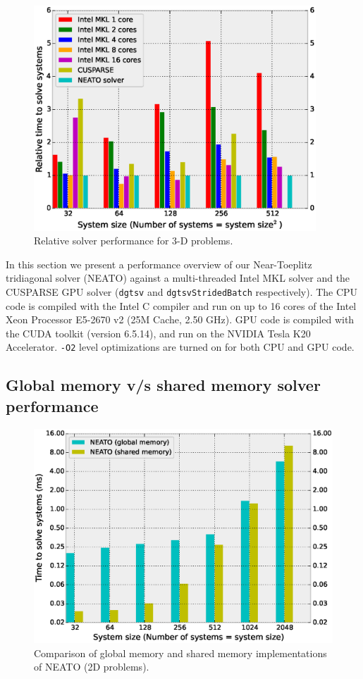 \documentclass{elsarticle}
\begin{document}
\begin{figure}[h!]
\begin{center}
\includegraphics[width=300pt]{fig/bench-3d.eps}
\caption{Relative solver performance for 3-D problems.}
\label{fig:bench-3d}
\end{center}
\end{figure}

In this section we present a performance overview
of our Near-Toeplitz tridiagonal solver (NEATO)
against a multi-threaded Intel MKL solver and
the CUSPARSE GPU solver
(\texttt{dgtsv} and \texttt{dgtsvStridedBatch} respectively).
The CPU code is compiled with the Intel C compiler
and run on up to 16 cores of the
Intel Xeon Processor E5-2670 v2 (25M Cache, 2.50 GHz).
GPU code is compiled with the CUDA toolkit (version 6.5.14),
and run on the
NVIDIA Tesla K20 Accelerator.
\texttt{-O2} level optimizations are turned on for both
CPU and GPU code.

\subsection{Global memory v/s shared memory solver performance}

\begin{figure}[h!]
\begin{center}
\includegraphics[width=1.0\linewidth]{fig/global-vs-shared-2d.eps}
\caption{Comparison of global memory and shared
    memory implementations of NEATO (2D problems).}
\label{fig:global-vs-shared-2d}
\end{center}
\end{figure}
\end{document}
